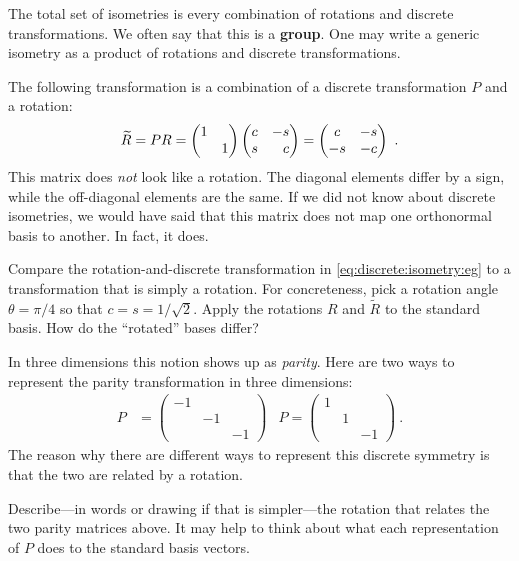 \documentclass[12pt, oneside]{report}    %
\begin{document}
\begin{subappendices}
The total set of isometries is every combination of rotations and discrete transformations. We often say that this is a \textbf{group}. One may write a generic isometry as a product of rotations and discrete transformations. 
\begin{example}
The following transformation is a combination of a discrete transformation $P$ and a rotation:
\begin{align}
    \tilde R = PR =
    \begin{pmatrix}
        1 & \\ 
        & 1 
    \end{pmatrix}
    \begin{pmatrix}
        c & -s\\ 
        s & \pp c
    \end{pmatrix}
    =
    \begin{pmatrix}
        c & -s\\ 
        -s & - c
    \end{pmatrix} \ .
    \label{eq:discrete:isometry:eg}
\end{align}
This matrix does \emph{not} look like a rotation. The diagonal elements differ by a sign, while the off-diagonal elements are the same. If we did not know about discrete isometries, we would have said that this matrix does not map one orthonormal basis to another. In fact, it does.
\end{example}
\begin{exercise}
Compare the rotation-and-discrete transformation in \eqref{eq:discrete:isometry:eg} to a transformation that is simply a rotation. For concreteness, pick a rotation angle $\theta = \pi/4$ so that $c=s=1/\sqrt{2}$. Apply the rotations $R$ and $\tilde R$ to the standard basis. How do the ``rotated'' bases differ?
\end{exercise}

In three dimensions this notion shows up as \emph{parity}. Here are two ways to represent the parity transformation in three dimensions:
\begin{align}
    P &=
    \begin{pmatrix}
        -1 & & \\
        & -1 & \\
        & & -1
    \end{pmatrix} 
    &
    P =
    \begin{pmatrix}
        1 & & \\
        & 1 & \\
        & & -1
    \end{pmatrix}
    \ .
\end{align}
The reason why there are different ways to represent this discrete symmetry is that the two are related by a rotation. 
\begin{exercise}
Describe---in words or drawing if that is simpler---the rotation that relates the two parity matrices above. It may help to think about what each representation of $P$ does to the standard basis vectors. 
\end{exercise}


\end{subappendices}
\end{document}
